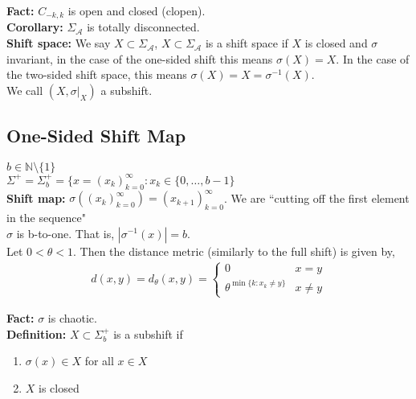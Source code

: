 \documentclass[12pt]{article}
\begin{document}
\textbf{Fact:} $C_{-k, k}$ is open and closed (clopen).\\

\textbf{Corollary:} $\Sigma_{\mathcal{A}}$ is totally disconnected.\\

\textbf{Shift space:} We say $X \subset \Sigma_{\mathcal{A}}$, $X \subset \Sigma_{\mathcal{A}}$ is a shift space if $X$ is closed and $\sigma$ invariant, in the case of the one-sided shift this means $\sigma(X) = X$. In the case of the two-sided shift space, this means $\sigma(X) = X = \sigma^{-1}(X)$.\\

We call $(X, \sigma|_X)$ a subshift.

\subsection{One-Sided Shift Map}

$b \in \mathbb{N} \setminus \{1\}$\\

$\Sigma^+ = \Sigma_b^+ = \{x = (x_k)_{k=0}^{\infty} : x_k \in \{0, \ldots, b - 1\}$\\

\textbf{Shift map:} $\sigma((x_k)_{k=0}^{\infty}) = (x_{k+1})_{k=0}^{\infty}$. We are ``cutting off the first element in the sequence"\\

$\sigma$ is b-to-one. That is, $|\sigma^{-1}(x)| = b$.\\

Let $0 < \theta < 1$. Then the distance metric (similarly to the full shift) is given by,
\begin{align*}
d(x, y) = d_{\theta}(x, y) = \begin{cases} 
      0 & x = y \\
      \theta^{\min\{k: x_k \neq y\}} & x \neq y
   \end{cases}
\end{align*}

\textbf{Fact:} $\sigma$ is chaotic.\\

\textbf{Definition:} $X \subset \Sigma_b^+$ is a subshift if
\begin{enumerate}[label=(\alph*)]
\item $\sigma(x) \in X$ for all $x \in X$

\item $X$ is closed
\end{enumerate}
\end{document}
